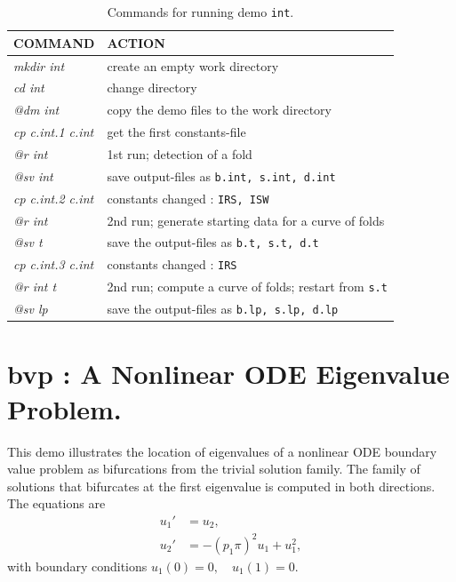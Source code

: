 \documentclass[12pt]{report}
\begin{document}
\begin{table}[htbp]
\begin{center}
\begin{tabular}{| l | l |}
\hline
  COMMAND  & ACTION \\
\hline
  {\it mkdir int} & create an empty work directory \\ 
  {\it cd int} & change directory \\
  {\it @dm int} & copy the demo files to the work directory \\
\hline
  {\it cp c.int.1 c.int} & get the first constants-file \\ 
  {\it @r int} & 1st run; detection of a fold \\ 
  {\it @sv int} & save output-files as {\tt b.int, s.int, d.int} \\ 
\hline
  {\it cp c.int.2 c.int} & constants changed : {\tt IRS, ISW }\\ 
  {\it @r int} & 2nd run; generate starting data for a curve of folds \\ 
  {\it @sv t} & save the output-files as {\tt b.t, s.t, d.t} \\ 
\hline

  {\it cp c.int.3 c.int} & constants changed : {\tt IRS} \\ 
  {\it @r int t} & 2nd run; compute a curve of folds; restart from {\tt s.t} \\ 
  {\it @sv lp} & save the output-files as {\tt b.lp, s.lp, d.lp} \\ 
\hline
\end{tabular}
\caption{Commands for running demo {\tt int}.}
\label{tbl:demo_int}
\end{center}
\end{table}

\newpage
\section{ bvp : A Nonlinear ODE Eigenvalue Problem.} \label{sec:Demos_bvp}
This demo illustrates the location of eigenvalues of a nonlinear ODE
boundary value problem as bifurcations from the trivial solution family.
The family of solutions that bifurcates at the first eigenvalue
is computed in both directions.
The equations are
\begin{equation} \begin{array}{cl}
 u_1 ' &= u_2  ,  \\
  u_2 ' &=-(p_1 \pi)^{2}u_1 + u_1^{2} ,\end{array} \end{equation}
with boundary conditions $ u_1(0)=0 ,  \quad  u_1(1)=0.$~~~
\end{document}
